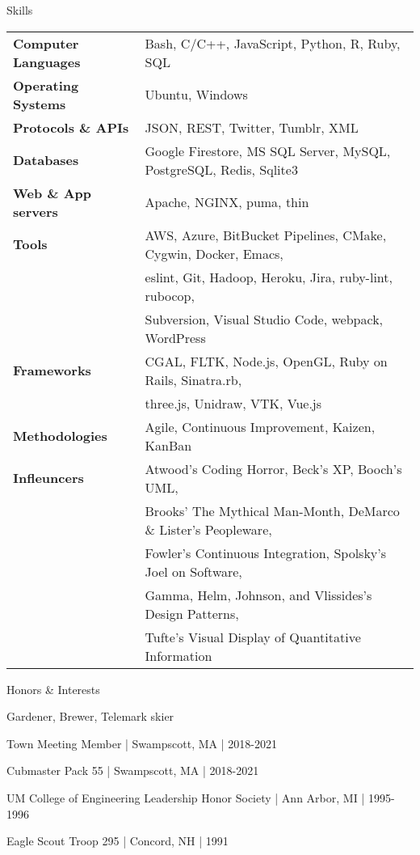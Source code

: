\documentclass{resume}
\begin{document}
\begin{rSection}{Skills}
\begin{tabular}{ @{} >{\bfseries}l @{\hspace{6ex}} l }
Computer Languages & Bash, C/C++, JavaScript, Python, R, Ruby, SQL \\
Operating Systems & Ubuntu, Windows \\
Protocols \& APIs & JSON, REST, Twitter, Tumblr, XML \\
Databases & Google Firestore, MS SQL Server, MySQL, PostgreSQL, Redis, Sqlite3 \\
Web \& App servers & Apache, NGINX, puma, thin \\
Tools & AWS, Azure, BitBucket Pipelines, CMake, Cygwin, Docker, Emacs, \\
 & eslint, Git, Hadoop, Heroku, Jira, ruby-lint, rubocop, \\
 & Subversion, Visual Studio Code, webpack, WordPress \\
Frameworks & CGAL, FLTK, Node.js, OpenGL, Ruby on Rails, Sinatra.rb, \\
 & three.js, Unidraw, VTK, Vue.js \\
Methodologies & Agile, Continuous Improvement, Kaizen, KanBan \\
Infleuncers & Atwood's Coding Horror, Beck's XP, Booch's UML, \\
 & Brooks' The Mythical Man-Month, DeMarco \& Lister's Peopleware, \\
 & Fowler's Continuous Integration, Spolsky's Joel on Software, \\
 & Gamma, Helm, Johnson, and Vlissides's Design Patterns, \\
 & Tufte's Visual Display of Quantitative Information
\end{tabular}
\end{rSection}

\begin{rSection}{Honors \& Interests}
\item Gardener, Brewer, Telemark skier
\item Town Meeting Member | Swampscott, MA | 2018-2021
\item Cubmaster Pack 55 | Swampscott, MA | 2018-2021
\item UM College of Engineering Leadership Honor Society | Ann Arbor, MI | 1995-1996
\item Eagle Scout Troop 295 | Concord, NH | 1991
\end{rSection}
\end{document}
